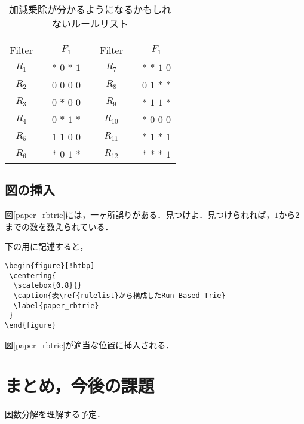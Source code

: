 \documentclass[10pt,twocolumn]{jarticle}
\begin{document}
\begin{table}[htbp]
 \begin{center}
  \caption{加減乗除が分かるようになるかもしれないルールリスト}
  \begin{tabular}{ccccccc}
        & &             & &        & &             \\ \cline{1-3} \cline{5-7}
 Filter & & $F_{1}$      & & Filter & & $F_{1}$      \\ \cline{1-3} \cline{5-7}
 $R_{1}$ & & $*$ $0$ $*$ $1$ & & $R_{7}$ & & $*$ $*$ $1$ $0$ \\
 $R_{2}$ & & $0$ $0$ $0$ $0$ & & $R_{8}$ & & $0$ $1$ $*$ $*$ \\
 $R_{3}$ & & $0$ $*$ $0$ $0$ & & $R_{9}$ & & $*$ $1$ $1$ $*$ \\
 $R_{4}$ & & $0$ $*$ $1$ $*$ & & $R_{10}$ & & $*$ $0$ $0$ $0$ \\
 $R_{5}$ & & $1$ $1$ $0$ $0$ & & $R_{11}$ & & $*$ $1$ $*$ $1$ \\
 $R_{6}$ & & $*$ $0$ $1$ $*$ & & $R_{12}$ & & $*$ $*$ $*$ $1$ \\ \cline{1-3} \cline{5-7}
  \end{tabular}
  \label{rulelist}
 \end{center}
\end{table}

\subsection{図の挿入}
図\ref{paper_rbtrie}には，一ヶ所誤りがある．見つけよ．見つけられれば，$1$から$2$までの数を数えられている．\par
\noindent 下の用に記述すると，
\begin{verbatim}
\begin{figure}[!htbp]
 \centering{
  \scalebox{0.8}{}
  \caption{表\ref{rulelist}から構成したRun-Based Trie}
  \label{paper_rbtrie}
 }
\end{figure}
\end{verbatim}

図\ref{paper_rbtrie}が適当な位置に挿入される．
\begin{figure*}[!htbp]
\end{figure*}


\section{まとめ，今後の課題}
因数分解を理解する予定．
\end{document}
